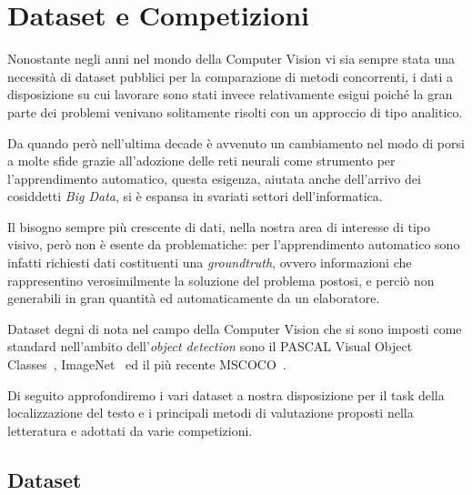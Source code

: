\chapter{Dataset e Competizioni}

Nonostante negli anni nel mondo della Computer Vision vi sia sempre stata una necessità di dataset pubblici per la comparazione di metodi concorrenti, i dati a disposizione su cui lavorare sono stati invece relativamente esigui poiché la gran parte dei problemi venivano solitamente risolti con un approccio di tipo analitico.\par
Da quando però nell'ultima decade è avvenuto un cambiamento nel modo di porsi a molte sfide grazie all'adozione delle reti neurali come strumento per l'apprendimento automatico, questa esigenza, aiutata anche dell'arrivo dei cosiddetti \textit{Big Data}, si è espansa in svariati settori dell'informatica.\par 
Il bisogno sempre più crescente di dati, nella nostra area di interesse di tipo visivo, però non è esente da problematiche: per l'apprendimento automatico sono infatti richiesti dati costituenti una \textit{groundtruth}, ovvero informazioni che rappresentino verosimilmente la soluzione del problema postosi, e perciò non generabili in gran quantità ed automaticamente da un elaboratore.\par
Dataset degni di nota nel campo della Computer Vision che si sono imposti come standard nell'ambito dell'\textit{object detection} sono il PASCAL Visual Object Classes~\cite{pascalvoc}, ImageNet~\cite{imagenet} ed il più recente MSCOCO~\cite{mscoco}.\par
Di seguito approfondiremo i vari dataset a nostra disposizione per il task della localizzazione del testo e i principali metodi di valutazione proposti nella letteratura e adottati da varie competizioni.

\section{Dataset}

